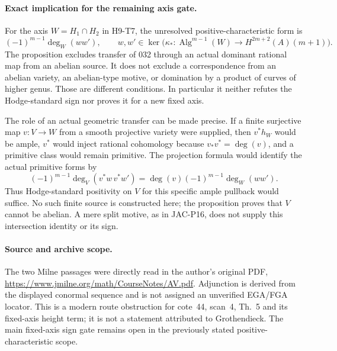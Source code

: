\paragraph{Exact implication for the remaining axis gate.}
For the axis $W=H_1\cap H_2$ in H9-T7, the unresolved
positive-characteristic form is
\[
       (-1)^{m-1}\deg_W(ww'),\qquad
       w,w'\in\ker\bigl(\kappa_*:
       \operatorname{Alg}^{m-1}(W)\longrightarrow
       H^{2m+2}(A)(m+1)\bigr).
\]
The proposition excludes transfer of 032 through an
actual dominant rational map from an abelian source.
It does not exclude a correspondence from an abelian
variety, an abelian-type motive, or domination by a
product of curves of higher genus. Those are different
conditions. In particular it neither refutes the
Hodge-standard sign nor proves it for a new fixed axis.

The role of an actual geometric transfer can be made
precise. If a finite surjective map $v:V\to W$ from a
smooth projective variety were supplied, then $v^*h_W$
would be ample, $v^*$ would inject rational cohomology
because $v_*v^*=\deg(v)$, and a primitive class would
remain primitive. The projection formula would identify
the actual primitive forms by
\[
       (-1)^{m-1}\deg_V(v^*w\,v^*w')
          =\deg(v)(-1)^{m-1}\deg_W(ww').
\]
Thus Hodge-standard positivity on $V$ for this specific
ample pullback would suffice. No such finite source is
constructed here; the proposition proves that $V$
cannot be abelian. A mere split motive, as in JAC-P16,
does not supply this intersection identity or its sign.

\paragraph{Source and archive scope.}
The two Milne passages were directly read in the
author's original PDF,
\url{https://www.jmilne.org/math/CourseNotes/AV.pdf}.
Adjunction is derived from the displayed conormal
sequence and is not assigned an unverified EGA/FGA
locator. This is a modern route obstruction for
cote~44, scan~4, Th.~5 and its fixed-axis height term;
it is not a statement attributed to Grothendieck.
The main fixed-axis sign gate remains open in the
previously stated positive-characteristic scope.
